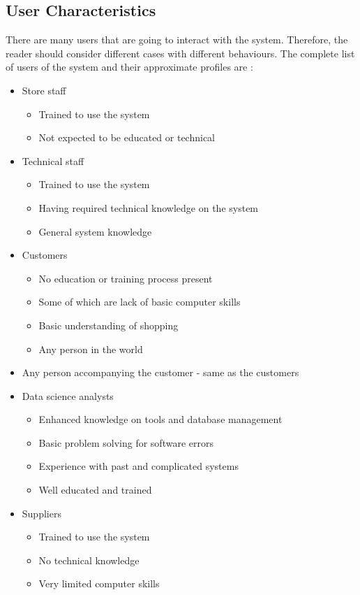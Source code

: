 \subsection{User Characteristics}
There are many users that are going to interact with the system. Therefore, the reader should consider different cases with different behaviours. The complete list of users of the system and their approximate profiles are :
\begin{itemize}
    \item Store staff
    \begin{itemize}
        \item Trained to use the system
        \item Not expected to be educated or technical
    \end{itemize}
    \item Technical staff
    \begin{itemize}
        \item Trained to use the system
        \item Having required technical knowledge on the system
        \item General system knowledge
    \end{itemize}
    \item Customers
    \begin{itemize}
        \item No education or training process present
        \item Some of which are lack of basic computer skills
        \item Basic understanding of shopping
        \item Any person in the world
    \end{itemize}
    \item Any person accompanying  the customer - same as the customers
    \item Data science analysts
    \begin{itemize}
        \item Enhanced knowledge on tools and database management
        \item Basic problem solving for software errors
        \item Experience with past and complicated systems
        \item Well educated and trained
    \end{itemize}
    \item Suppliers
    \begin{itemize}
        \item Trained to use the system
        \item No technical knowledge
        \item Very limited computer skills
    \end{itemize}
\end{itemize}

